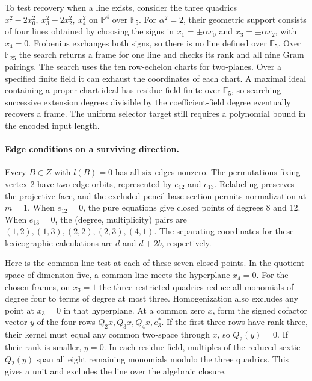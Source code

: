 To test recovery when a line exists, consider the three quadrics
\(x_1^2-2x_0^2,\ x_3^2-2x_2^2,\ x_4^2\) on \(\mathbb P^4\) over
\(\mathbb F_5\). For \(\alpha^2=2\), their geometric support consists of
four lines obtained by choosing the signs in \(x_1=\pm\alpha x_0\)
and \(x_3=\pm\alpha x_2\), with \(x_4=0\). Frobenius exchanges both
signs, so there is no line defined over \(\mathbb F_5\). Over
\(\mathbb F_{25}\) the search returns a frame for one line and checks
its rank and all nine Gram pairings. The search uses the ten row-echelon
charts for two-planes. Over a specified finite field it can exhaust
the coordinates of each chart. A maximal ideal containing a proper
chart ideal has residue field finite over \(\mathbb F_5\), so searching
successive extension degrees divisible by the coefficient-field degree
eventually recovers a frame. The uniform selector target still requires
a polynomial bound in the encoded input length.

\paragraph{Edge conditions on a surviving direction.}
Every \(B\in Z\) with \(l(B)=0\) has all six edges nonzero. The
permutations fixing vertex 2 have two edge orbits, represented by
\(e_{12}\) and \(e_{13}\). Relabeling preserves the projective face,
and the excluded pencil base section permits normalization at \(m=1\).
When \(e_{12}=0\), the pure equations give closed points of degrees
8 and 12. When \(e_{13}=0\), the (degree, multiplicity) pairs are
\((1,2),(1,3),(2,2),(2,3),(4,1)\). The separating coordinates for
these lexicographic calculations are \(d\) and \(d+2b\), respectively.

Here is the common-line test at each of these seven closed points. In
the quotient space of dimension five, a common line meets the hyperplane
\(x_4=0\). For the chosen frames, on \(x_3=1\) the three restricted
quadrics reduce all monomials of degree four to terms of degree at most
three. Homogenization also excludes any point at \(x_3=0\) in that
hyperplane. At a common zero \(x\), form the signed cofactor vector
\(y\) of the four rows \(Q_2x,Q_3x,Q_4x,e_3^*\).
If the first three rows have rank three, their kernel must equal
any common two-space through \(x\), so \(Q_2(y)=0\). If their rank is
smaller, \(y=0\). In each residue field, multiples of the reduced sextic
\(Q_2(y)\) span all eight remaining monomials modulo the three quadrics.
This gives a unit and excludes the line over the algebraic closure.

